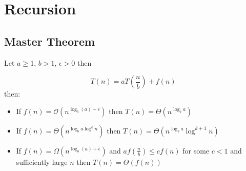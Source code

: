 \section{Recursion}
\subsection{Master Theorem}

Let \( a \geq 1 \), \( b > 1 \), \( \epsilon > 0 \) then

\begin{equation}
    T(n) = a T \left( \frac{n}{b} \right) + f(n)
\end{equation}
then:
\begin{itemize}
    \item  If \( f(n) = \mathcal{O} \left( n^{\log_b (a) - \epsilon} \right) \) then \( T(n) = \Theta \left( n^{\log_b a} \right) \)
    \item If \( f(n) = \Theta \left( n^{\log_b a \log^k n} \right) \) then \( T(n) = \Theta \left( n^{\log_b a} \log^{k+1} n \right) \)
    \item If \( f(n) = \Omega \left( n^{\log_b (a) + \epsilon} \right) \) and \( a f \left( \frac{n}{b} \right) \leq c f(n) \) for some \( c < 1 \) and sufficiently large \( n \) then \( T(n) = \Theta \left( f \left(n \right) \right) \)
\end{itemize}
